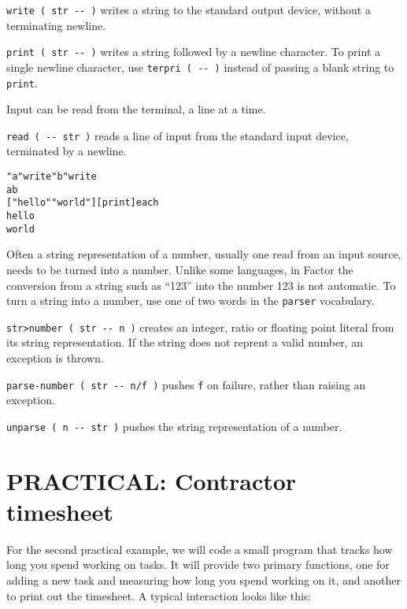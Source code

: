 \documentclass[english]{article}
\begin{document}
\texttt{write ( str -{}- )} writes a string to the standard output
device, without a terminating newline.

\texttt{print ( str -{}- )} writes a string followed by a newline
character. To print a single newline character, use \texttt{terpri (
-{}- )} instead of passing a blank string to \texttt{print}.

Input can be read from the terminal, a line at a time.

\texttt{read ( -{}- str )} reads a line of input from the standard
input device, terminated by a newline.

\begin{alltt}
"a" write "b" write
ab
{[} "hello" "world" {]} {[} print {]} each
hello
world
\end{alltt}
Often a string representation of a number, usually one read from an
input source, needs to be turned into a number. Unlike some languages,
in Factor the conversion from a string such as {}``123'' into the
number 123 is not automatic. To turn a string into a number, use one
of two words in the \texttt{parser} vocabulary.

\texttt{str>number ( str -{}- n )} creates an integer, ratio or floating
point literal from its string representation. If the string does not
reprent a valid number, an exception is thrown.

\texttt{parse-number ( str -{}- n/f )} pushes \texttt{f} on failure, rather
than raising an exception.

\texttt{unparse ( n -{}- str )} pushes the string representation of
a number.


\section{PRACTICAL: Contractor timesheet}

For the second practical example, we will code a small program that tracks how long you spend working on tasks. It will provide two primary functions, one for adding a new task and measuring how long you spend working on it, and another to print out the timesheet. A typical interaction looks like this:
\end{document}
